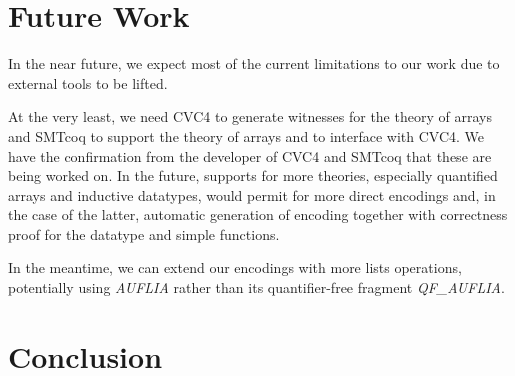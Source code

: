 \documentclass[10pt]{article}
\begin{document}


\section{Future Work}
In the near future, we expect most of the current limitations to our work due to external tools to be lifted.

At the very least, we need CVC4 to generate witnesses for the theory of arrays and SMTcoq to support the theory of arrays and to interface with CVC4. We have the confirmation from the developer of CVC4 and SMTcoq that these are being worked on. In the future, supports for more theories, especially quantified arrays and inductive datatypes, would permit for more direct encodings and, in the case of the latter, automatic generation of encoding together with correctness proof for the datatype and simple functions.

In the meantime, we can extend our encodings with more lists operations, potentially using \emph{AUFLIA} rather than its quantifier-free fragment \emph{QF\_AUFLIA}.
\section{Conclusion}
\end{document}
